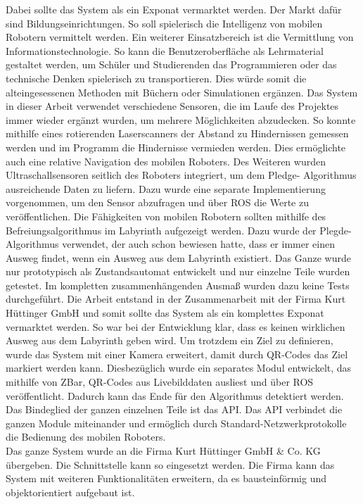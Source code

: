 Dabei sollte das System als ein Exponat vermarktet werden. Der Markt dafür sind Bildungseinrichtungen. So soll spielerisch die Intelligenz von mobilen Robotern vermittelt werden. Ein weiterer Einsatzbereich ist die Vermittlung von Informationstechnologie. So kann die Benutzeroberfläche als Lehrmaterial gestaltet werden, um Schüler und Studierenden das Programmieren oder das technische Denken spielerisch zu transportieren. Dies würde somit die alteingesessenen Methoden mit Büchern oder Simulationen ergänzen. Das System in dieser Arbeit verwendet verschiedene Sensoren, die im Laufe des Projektes immer wieder ergänzt wurden, um mehrere Möglichkeiten abzudecken. So konnte mithilfe eines rotierenden Laserscanners der Abstand zu Hindernissen gemessen werden und im Programm die Hindernisse vermieden werden. Dies ermöglichte auch eine relative Navigation des mobilen Roboters. Des Weiteren wurden Ultraschallsensoren seitlich des Roboters integriert, um dem Pledge- Algorithmus ausreichende Daten zu liefern. Dazu wurde eine separate Implementierung vorgenommen, um den Sensor abzufragen und über ROS die Werte zu veröffentlichen. Die Fähigkeiten von mobilen Robotern sollten mithilfe des Befreiungsalgorithmus im Labyrinth aufgezeigt werden. Dazu wurde der Plegde- Algorithmus verwendet, der auch schon bewiesen hatte, dass er immer einen Ausweg findet, wenn ein Ausweg aus dem Labyrinth existiert. Das Ganze wurde nur prototypisch als Zustandsautomat entwickelt und nur einzelne Teile wurden getestet. Im kompletten zusammenhängenden Ausmaß wurden dazu keine Tests durchgeführt. Die Arbeit entstand in der Zusammenarbeit mit der Firma Kurt Hüttinger GmbH und somit sollte das System als ein komplettes Exponat vermarktet werden. So war bei der Entwicklung klar, dass es keinen wirklichen Ausweg aus dem Labyrinth geben wird. Um trotzdem ein Ziel zu definieren, wurde das System mit einer Kamera erweitert, damit durch QR-Codes das Ziel markiert werden kann. Diesbezüglich wurde ein separates Modul entwickelt, das mithilfe von ZBar, QR-Codes aus Livebilddaten ausliest und über ROS veröffentlicht. Dadurch kann das Ende für den Algorithmus detektiert werden. Das Bindeglied der ganzen einzelnen Teile ist das API. Das API verbindet die ganzen Module miteinander und ermöglich durch Standard-Netzwerkprotokolle die Bedienung des mobilen Roboters.\\
Das ganze System wurde an die Firma Kurt Hüttinger GmbH \& Co. KG übergeben. Die Schnittstelle kann so eingesetzt werden. Die Firma kann das System mit weiteren Funktionalitäten erweitern, da es bausteinförmig und objektorientiert aufgebaut ist.\\
